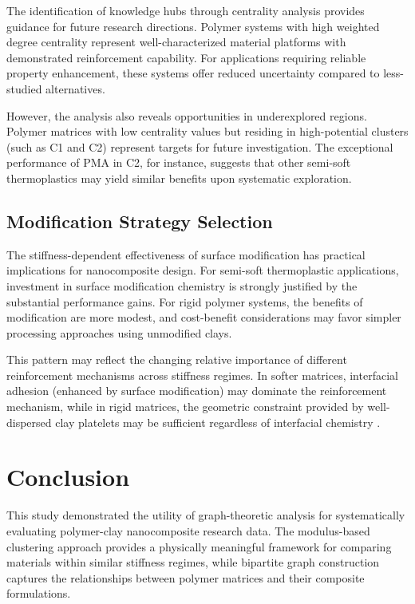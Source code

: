 \documentclass[conference]{IEEEtran}
\begin{document}
The identification of knowledge hubs through centrality analysis provides guidance for future research directions. Polymer systems with high weighted degree centrality represent well-characterized material platforms with demonstrated reinforcement capability. For applications requiring reliable property enhancement, these systems offer reduced uncertainty compared to less-studied alternatives.

However, the analysis also reveals opportunities in underexplored regions. Polymer matrices with low centrality values but residing in high-potential clusters (such as C1 and C2) represent targets for future investigation. The exceptional performance of PMA in C2, for instance, suggests that other semi-soft thermoplastics may yield similar benefits upon systematic exploration.

\subsection{Modification Strategy Selection}

The stiffness-dependent effectiveness of surface modification has practical implications for nanocomposite design. For semi-soft thermoplastic applications, investment in surface modification chemistry is strongly justified by the substantial performance gains. For rigid polymer systems, the benefits of modification are more modest, and cost-benefit considerations may favor simpler processing approaches using unmodified clays.

This pattern may reflect the changing relative importance of different reinforcement mechanisms across stiffness regimes. In softer matrices, interfacial adhesion (enhanced by surface modification) may dominate the reinforcement mechanism, while in rigid matrices, the geometric constraint provided by well-dispersed clay platelets may be sufficient regardless of interfacial chemistry \cite{zare2020effects, domun2015improving}.

\section{Conclusion}

This study demonstrated the utility of graph-theoretic analysis for systematically evaluating polymer-clay nanocomposite research data. The modulus-based clustering approach provides a physically meaningful framework for comparing materials within similar stiffness regimes, while bipartite graph construction captures the relationships between polymer matrices and their composite formulations.
\end{document}
